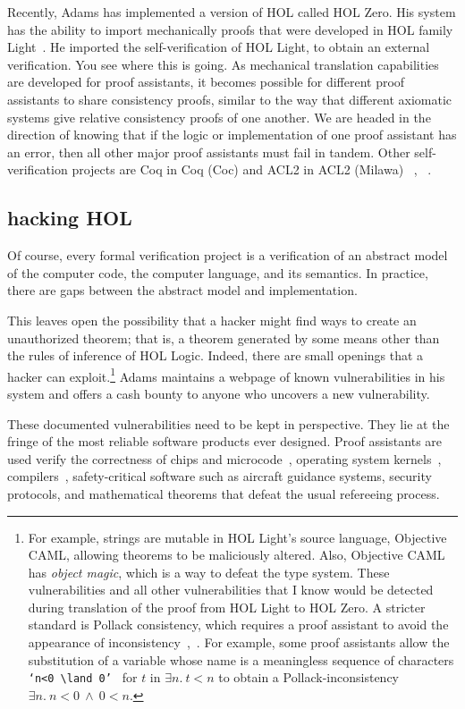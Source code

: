 \documentclass{llncs}
\begin{document}
Recently, Adams has implemented a version of HOL called HOL Zero.  His
system has the ability to import mechanically proofs that were
developed in HOL family Light~\cite{Adams}.  He imported the
self-verification of HOL Light, to obtain an external verification.
You see where this is going.  As mechanical translation capabilities
are developed for proof assistants, it becomes possible for different
proof assistants to share consistency proofs, similar to the way that
different axiomatic systems give relative consistency proofs of one
another.  We are headed in the direction of knowing that if the logic
or implementation of one proof assistant has an error, then all other
major proof assistants must fail in tandem. Other self-verification
projects are Coq in Coq (Coc) and ACL2 in ACL2 (Milawa) ~\cite{Bar98},
~\cite{Dav09}.

\subsection{hacking HOL}

Of course, every formal verification project is a verification of an
abstract model of the computer code, the computer language, and its
semantics.  In practice, there are gaps between the abstract
model and implementation.

  
This leaves open the possibility that a hacker might find ways to
create an unauthorized theorem; that is, a theorem generated by some
means other than the rules of inference of HOL Logic.  Indeed, there
are small openings that a hacker can exploit.\footnote{For example,
  strings are mutable in HOL Light's source language, Objective CAML,
  allowing theorems to be maliciously altered.  Also, Objective CAML
  has {\it object magic}, which is a way to defeat the type system.
  These vulnerabilities and all other vulnerabilities that I know
  would be detected during translation of the proof from HOL Light to
  HOL Zero.  A stricter standard is Pollack consistency, which
  requires a proof assistant to avoid the appearance of
  inconsistency~\cite{Adams},~\cite{wiedijk:pollack}.  For example,
  some proof assistants allow the substitution of a variable
  whose name is a meaningless sequence of characters {\tt
    `n<0~$\land$~0' } for $t$ in $\exists n.~t<n$ to obtain a
  Pollack-inconsistency $\exists n.~{ {n<0~\land~0}}<n$.  } Adams maintains
a webpage of known vulnerabilities in his system and offers a cash
bounty to anyone who uncovers a new vulnerability.

These documented vulnerabilities need to be kept in perspective.  They
lie at the fringe of the most reliable software products ever
designed. Proof assistants are used verify the correctness of chips
and microcode~\cite{FoxArm6}, operating system kernels~\cite{seL4}, 
compilers~\cite{CC}, safety-critical software such as aircraft
guidance systems, security protocols, and mathematical theorems that
defeat the usual refereeing process.  
\end{document}
